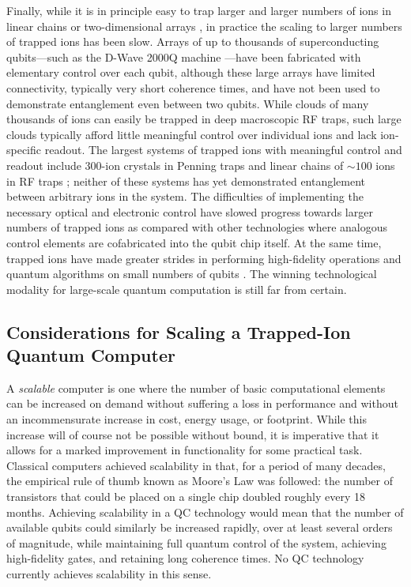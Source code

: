 \documentclass[%
12pt,
 amsmath,amssymb,
]{revtex4-2}
\begin{document}
Finally, while it is in principle easy to trap larger and larger numbers of ions in linear chains \cite{PaganoCryoChains2018} or two-dimensional arrays \cite{BruzewiczArrayLoading2016}, in practice the scaling to larger numbers of trapped ions has been slow. Arrays of up to thousands of superconducting qubits---such as the D-Wave 2000Q machine \cite{DWave}---have been fabricated with elementary control over each qubit, although these large arrays have limited connectivity, typically very short coherence times, and have not been used to demonstrate entanglement even between two qubits. While clouds of many thousands of ions can easily be trapped in deep macroscopic RF traps, such large clouds typically afford little meaningful control over individual ions and lack ion-specific readout. The largest systems of trapped ions with meaningful control and readout include 300-ion crystals in Penning traps \cite{BohnetSpinDynamics2016} and linear chains of ${\sim}100$ ions in RF traps \cite{PaganoCryoChains2018}; neither of these systems has yet demonstrated entanglement between arbitrary ions in the system. The difficulties of implementing the necessary optical and electronic control have slowed progress towards larger numbers of trapped ions as compared with other technologies where analogous control elements are cofabricated into the qubit chip itself. At the same time, trapped ions have made greater strides in performing high-fidelity operations \cite{HartyHighFidelityIons2014, Ballance2QubitHyperfineGate2016} and quantum algorithms on small numbers of qubits \cite{LanyonDigSim2011, LinkeArchCompare2017}. The winning technological modality for large-scale quantum computation is still far from certain.

\subsection{Considerations for Scaling a Trapped-Ion Quantum Computer}
\label{Sec:Practical}


A \emph{scalable} computer is one where the number of basic computational elements can be increased on demand without suffering a loss in performance and without an incommensurate increase in cost, energy usage, or footprint. While this increase will of course not be possible without bound, it is imperative that it allows for a marked improvement in functionality for some practical task.  Classical computers achieved scalability in that, for a period of many decades, the empirical rule of thumb known as Moore's Law was followed: the number of transistors that could be placed on a single chip doubled roughly every 18 months. Achieving scalability in a QC technology would mean that the number of available qubits could similarly be increased rapidly, over at least several orders of magnitude, while maintaining full quantum control of the system, achieving high-fidelity gates, and retaining long coherence times. No QC technology currently achieves scalability in this sense.
\end{document}
